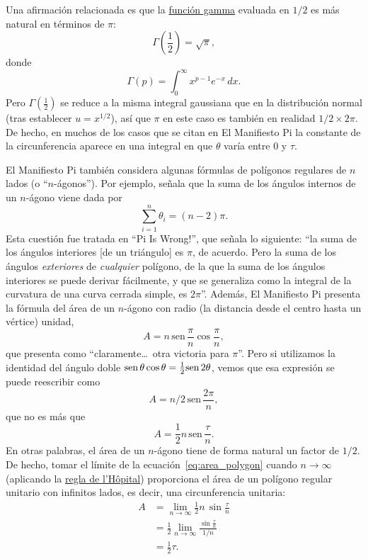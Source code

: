 Una afirmación relacionada es que la \href{http://mathworld.wolfram.com/GammaFunction.html}{función gamma} evaluada en $1/2$ es más natural en términos de $\pi$:
\[
\Gamma(\textstyle{\frac{1}{2}}) = \sqrt{\pi},
\]
donde
\begin{equation}
\label{eq:gamma}
\Gamma(p) = \int_{0}^{\infty} x^{p-1} e^{-x}\,dx.
\end{equation}
Pero $\Gamma(\frac{1}{2})$ se reduce a la misma integral gaussiana que en la distribución normal (tras establecer $u = x^{1/2}$), así que $\pi$ en este caso es también en realidad $1/2\times 2\pi$. De hecho, en muchos de los casos que se citan en El Manifiesto Pi la constante de la circunferencia aparece en una integral en que $\theta$ varía entre $0$ y $\tau$.

El Manifiesto Pi también considera algunas fórmulas de polígonos regulares de
$n$ lados (o ``$n$-ágonos''). Por ejemplo, señala que la suma de los ángulos internos de un $n$-ágono viene dada por
\[
\sum_{i=1}^n \theta_i=(n-2)\pi.
\]
Esta cuestión fue tratada en ``Pi Is Wrong!'', que señala lo siguiente: ``la suma de los ángulos interiores [de un triángulo] es $\pi$, de acuerdo. Pero la suma de los ángulos \emph{exteriores} de \emph{cualquier} polígono, de la que la suma de los ángulos interiores se puede derivar fácilmente, y que se generaliza como la integral de la curvatura de una curva cerrada simple, es $2\pi$''. Además, El Manifiesto Pi presenta la fórmula del área de un $n$-ágono con radio (la distancia desde el centro hasta un vértice) unidad,
\[ A=n\,\mbox{sen}\,\frac{\pi}{n}\cos\frac{\pi}{n}, \]
que presenta como ``claramente\ldots\ otra victoria para $\pi$''. Pero si utilizamos la identidad del ángulo doble $\mbox{sen}\,\theta\cos\theta = \frac{1}{2} \mbox{sen}\, 2\theta$, vemos que esa expresión se puede reescribir como
\[ A = n/2\, \mbox{sen}\,\frac{2\pi}{n}, \]
que no es más que
\begin{equation}
\label{eq:area_polygon}
A = \frac{1}{2} n\, \mbox{sen}\,\frac{\tau}{n}.
\end{equation}
En otras palabras, el área de un $n$-ágono tiene de forma natural un factor de $1/2$. De hecho, tomar el límite de la ecuación~\eqref{eq:area_polygon} cuando $n\rightarrow \infty$ (aplicando la \href{http://mathworld.wolfram.com/LHospitalsRule.html}{regla de l'H\^{o}pital}) proporciona el área de un polígono regular unitario con infinitos lados, es decir, una circunferencia unitaria:
\begin{equation}
\label{eq:lhopital}
\begin{split}
A & = \lim_{n\rightarrow\infty} \frac{1}{2} n\, \sin\frac{\tau}{n} \\
  & = \frac{1}{2} \lim_{n\rightarrow\infty} \frac{\sin\frac{\tau}{n}}{1/n} \\
  & = \tfrac{1}{2}\tau.
\end{split}
\end{equation}

